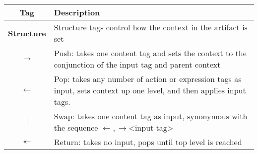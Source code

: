 \begin{table}[h!]
  \centering
  \begin{tabular}{c p{1.8\linewidth}}
    \textbf{Tag} & \textbf{Description} \\
    \hline
    \hline


    \textbf{Structure} &  Structure tags control how the context in the artifact is set \\
    \hline
    $\rightarrow$ & Push: takes one content tag and sets the context to the conjunction of the input tag and parent context \\
    $\leftarrow$ & Pop: takes any number of action or expression tags as input, sets context up one level, and then applies input tags.\\
    $|$ & Swap: takes one content tag as input, synonymous with the sequence $\leftarrow, \rightarrow \text{<input tag>}$ \\
    $\twoheadleftarrow$ & Return: takes no input, pops until top level is reached \\


\end{tabular}
\end{table}
